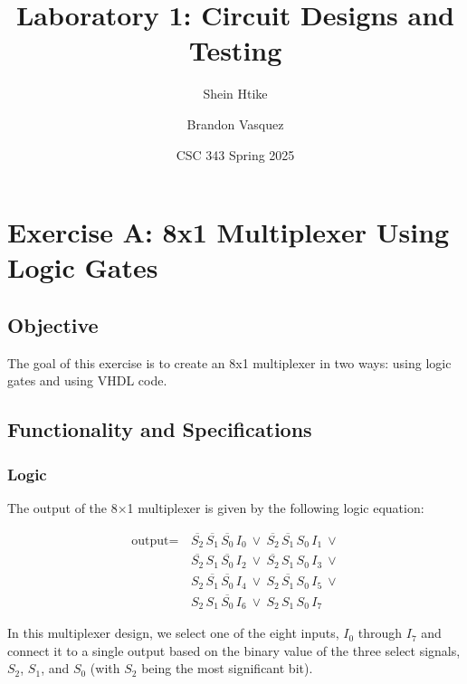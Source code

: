 \documentclass[12pt]{article}
\begin{document}
\title{Laboratory 1: Circuit Designs and Testing}
\author{Shein Htike \and Brandon Vasquez}
\date{CSC 343 Spring 2025}
\maketitle

\tableofcontents
\clearpage

\section{Exercise A: 8x1 Multiplexer Using Logic Gates}
\subsection{Objective}
The goal of this exercise is to create an 8x1 multiplexer in two ways: using logic gates and using VHDL code.
\subsection{Functionality and Specifications}
\subsubsection{Logic}
The output of the 8×1 multiplexer is given by the following logic equation:

\begin{equation}
\begin{split}
\text{output} =\,& \overline{S_2}\,\overline{S_1}\,\overline{S_0}\,I_0 \ \vee\ \overline{S_2}\,\overline{S_1}\,S_0\,I_1 \ \vee \\[1mm]
                & \overline{S_2}\,S_1\,\overline{S_0}\,I_2 \ \vee\ \overline{S_2}\,S_1\,S_0\,I_3 \ \vee \\[1mm]
                & S_2\,\overline{S_1}\,\overline{S_0}\,I_4 \ \vee\ S_2\,\overline{S_1}\,S_0\,I_5 \ \vee \\[1mm]
                & S_2\,S_1\,\overline{S_0}\,I_6 \ \vee\ S_2\,S_1\,S_0\,I_7 
\end{split}
\end{equation}

In this multiplexer design, we select one of the eight inputs, $I_{0}$ through $I_{7}$ and connect it to a single output based on the binary value of the three select signals, $S_{2}$, $S_{1}$, and $S_{0}$ (with $S_{2}$ being the most significant bit).
\clearpage
\end{document}
